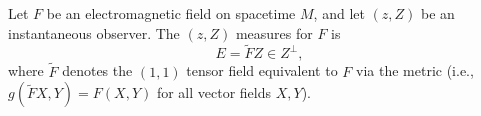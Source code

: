 Let $F$ be an electromagnetic field on spacetime $M$, and let $(z, Z)$ be an instantaneous observer. The  $(z, Z)$ measures for $F$ is
$$E = \tilde{F}Z \in Z^\perp,$$
where $\tilde{F}$ denotes the $(1,1)$ tensor field equivalent to $F$ via the metric (i.e., $g(\tilde{F}X, Y) = F(X, Y)$ for all vector fields $X, Y$).
